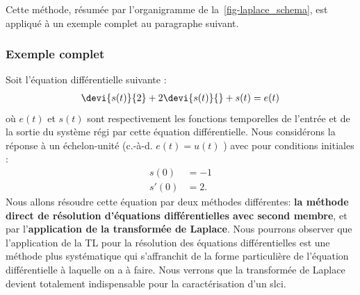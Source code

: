 Cette méthode, résumée par l'organigramme de la~\cref{fig-laplace_schema}, 
est appliqué à un exemple complet au paragraphe suivant.
\subsubsection{Exemple complet}
Soit l'équation différentielle suivante :
\begin{align}
\devi{s(t)}{2}+2\devi{s(t)}{} + s(t) = e(t)\label{eq-diff1}
\end{align}
où $e(t)$ et $s(t)$ sont respectivement les fonctions temporelles de l'entrée 
et de la sortie du système régi par cette équation différentielle. 
Nous considérons la réponse à un échelon-unité (c.-à-d. $e(t)=u(t)$ ) 
avec pour conditions initiales :
\begin{align*}
    s(0) &=-1\\
    s'(0)&=2.
\end{align*}
Nous allons résoudre cette équation par deux méthodes différentes: 
\textbf{la méthode direct de résolution d'équations différentielles avec 
second membre}, et par l'\textbf{application de la transformée de Laplace}.
Nous pourrons observer que l'application de la TL pour la résolution
des équations différentielles est une méthode plus systématique qui 
s'affranchit de la forme particulière de l'équation différentielle 
à laquelle on a à faire. Nous verrons que la transformée de Laplace devient 
totalement indispensable pour la caractérisation d'un \gls{slci}.
\newpage

\captionsetup{width=0.9\linewidth,labelfont=bf}

